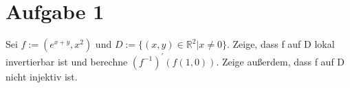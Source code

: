 \documentclass{scrartcl}
\begin{document}
\section*{Aufgabe 1}

Sei $f:=(e^{x+y},x^2)$ und $D:=\{(x,y)\in\mathbb R^2|x\neq 0\}$. Zeige, dass f auf D lokal invertierbar ist
und berechne $(f^{-1})^\prime(f(1,0))$. Zeige au\ss{}erdem, dass f auf D nicht injektiv ist.
\end{document}
